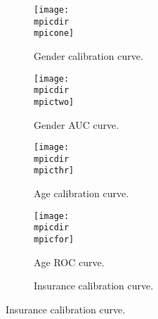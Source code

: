 \begin{figure}
\begin{adjustbox}{minipage=7.0in,frame}
\vspace{2.5mm}
\centering
%
\def\mpicdir{supplementary/metrics/}
%
\def\mcapbig{Prediction of Patient Characteristics: Metrics.}
\def\mlabbig{fig:supmetrics}
%
\def\mpicone{gender_cal.pdf}
\def\mcapone{Gender calibration curve.}
\def\mlabone{fig:calgender}
\def\mpictwo{gender_ROC.pdf}
\def\mcaptwo{Gender AUC curve.}
\def\mlabtwo{fig:aucgender}
\def\mpicthr{age_cal.pdf}
\def\mcapthr{Age calibration curve.}
\def\mlabthr{fig:calage}
\def\mpicfor{age_ROC.pdf}
\def\mcapfor{Age ROC curve.}
\def\mlabfor{fig:aucage}
\def\mpicfiv{insurance_cal.pdf}
\def\mcapfiv{Insurance calibration curve.}
\def\mlabfiv{fig:calinsurance}
\def\mpicsix{insurance_ROC.pdf}
\def\mcapsix{Insurance ROC curve.}
\def\mlabsix{fig:aucinsurance}
\def\mpicsev{race_cal.pdf}
\def\mcapsev{Race calibration curve.}
\def\mlabsev{fig:calrace}
\def\mpicate{race_ROC.pdf}
\def\mcapate{Race ROC curve.}
\def\mlabate{fig:aucrace}
%
%
\begin{subfigure}[t]{.45\linewidth}
    \centering
    \caption{\mcapone}\label{\mlabone}
    \texttt{[image: \\mpicdir\\mpicone]}
\end{subfigure}%
\begin{subfigure}[t]{.45\linewidth}
    \centering
    \captionsetup[subfigure]{}
    \caption{\mcaptwo}\label{\mlabtwo}
    \vspace{-3mm}
    \texttt{[image: \\mpicdir\\mpictwo]}
\end{subfigure}%
\vspace{0mm}
\begin{subfigure}[t]{.45\linewidth}
    \centering
    \captionsetup[subfigure]{}
    \caption{\mcapthr}\label{\mlabthr}
    \texttt{[image: \\mpicdir\\mpicthr]}
\end{subfigure}%
\begin{subfigure}[t]{.45\linewidth}
    \centering
    \captionsetup[subfigure]{}
    \caption{\mcapfor}\label{\mlabfor}
    \vspace{-3mm}
    \texttt{[image: \\mpicdir\\mpicfor]}
\end{subfigure}%
\vspace{0mm}
\begin{subfigure}[t]{.45\linewidth}
    \centering
    \captionsetup[subfigure]{}
    \caption{\mcapfiv}\label{\mlabfiv}

\end{subfigure}
\end{adjustbox}
\end{figure}
